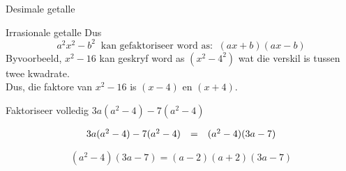 \begin{Aktiwiteit}{Desimale getalle}
\begin{aktiwiteit}{Irrasionale getalle}
Dus
\begin{equation*}
{a}^{2}{x}^{2}-{b}^{2}~\mbox{ kan gefaktoriseer word as: }~(ax+b)(ax-b)
\end{equation*}
Byvoorbeeld, ${x}^{2}-16$ kan geskryf word as $({x}^{2}-{4}^{2})$ wat die verskil is tussen twee kwadrate. 
\\Dus, die faktore van ${x}^{2}-16$ is $(x-4)$ en $(x+4)$.\par 





\begin{wex}{}
{Faktoriseer volledig $3a(a^2-4)-7(a^2-4)$ \par }

{


\begin{equation*}
\begin{array}{ccc}\hfill 3a(a^2-4)-7(a^2-4)& =& (a^2-4)(3a-7)\hfill \end{array}
\end{equation*}


$$
(a^2-4)(3a-7) = (a-2)(a+2)(3a-7)
$$

}
\end{wex}



\end{aktiwiteit}
\end{Aktiwiteit}

